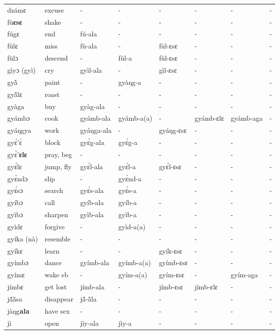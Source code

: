 \begin{sidewaystable}
\begin{longtable}{lp{3.5cm}llllll}
dzámɛ & excuse & - & - & - & -  & - & - \\ 
fù{\bfseries ɛsɛ} & shake & - & - &  - & - & - & - \\
 fúgɛ & end & fú-ala & - & - & - & - & - \\
fùlɛ & miss & fù-ala & - & fùl-ɛsɛ & - & - & - \\
fùlɔ & descend & - &  fùl-a & fùl-ɛsɛ & - & - & - \\
gìyɔ (gyì) & cry & gyìl-ala & - & gìl-ɛsɛ & - & - & - \\
gyã̀ & paint & - & gyàŋg-a & - & - & - & - \\
gyã̂lɛ & roast & - & - & - & - & - & - \\
 gyàga & buy & gyàg-ala & - & - & - & - & - \\
gyámbɔ & cook & gyámb-ala & gyámb-a(a) & - & gyámb-ɛlɛ & gyámb-aga & - \\
gyáŋgya & work & gyáŋga-ala  & - & gyáŋg-ɛsɛ & - & - & - \\
gyɛ́'ɛ̀ & block & gyɛ́g-ala & gyɛ́g-a & - & - & - & - \\
gyɛ̀'{\bfseries ɛlɛ} & pray, beg & - & - & - & - & - & - \\
gyɛ́lɛ & jump, fly & gyɛ́l-ala & gyɛ́l-a & gyɛ́l-ɛsɛ & - & - &  - \\ 
gyɛ̀ndɔ & slip & - &  gyɛ̀nd-a & - & - & - & - \\
gyɛ́sɔ & search & gyɛ́s-ala & gyɛ́s-a & - & - & - & - \\
gyíbɔ & call & gyíb-ala & gyíb-a  & - & - & - & - \\
gyìbɔ & sharpen & gyìb-ala & gyìb-a & - & - & - & - \\
gyìdɛ & forgive & - & gyìd-a(a) & - & - & - & - \\
gyíka (nà) & resemble & - & - & - & - & - & - \\
gyíkɛ & learn & - & - & gyík-ɛsɛ & - & - & - \\
gyímbɔ & dance & gyímb-ala &  gyímb-a(a) & gyímb-ɛsɛ & - & - & - \\
gyímɛ & wake sb & - & gyím-a(a) & gyím-ɛsɛ & - & gyím-aga & - \\
jímbɛ & get lost & jímb-ala & - & jímb-ɛsɛ & jímb-ɛlɛ  & - & - \\
jã́ã̀sa & disappear & jã́-ã̀la & - & - & -  & - & - \\
jàŋg{\bfseries ala} & have sex & - & - & - & - & - & - \\
jì & open & jìy-ala & jìy-a & - & - & - & - \\

\end{longtable}
\end{sidewaystable}
